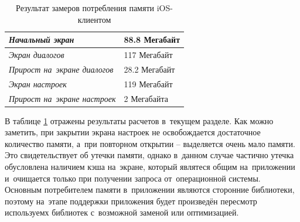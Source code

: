\begin{table}[h!]
\caption{Результат замеров потребления памяти iOS-клиентом}
\label{sec:eng:memory:result}
\centering
\begin{tabularx}{\textwidth}{ |X|X| } 
 \hline
 \emph{Начальный экран} & \num{88.8} Мегабайт \\ 
 \hline
 \emph{Экран диалогов} & \num{117} Мегабайт \\ 
 \hline
 \emph{Прирост на~экране диалогов} & \num{28.2} Мегабайт \\ 
 \hline
 \emph{Экран настроек} & \num{119} Мегабайт \\ 
 \hline
 \emph{Прирост на~экране настроек} & \num{2} Мегабайта \\ 
 \hline
\end{tabularx}
\end{table}

В таблице \ref{sec:eng:memory:result} отражены результаты расчетов в~текущем разделе. Как можно заметить, при закрытии экрана настроек не освобождается достаточное количество памяти, а~при повторном открытии -- выделяется очень мало памяти. Это свидетельствует об утечки памяти, однако в~данном случае частично утечка обусловлена наличием кэша на~экране, который являтеся общим на~приложении и~очищается только при получении запроса от~операционной системы. Основным потребителем памяти в~приложении являются сторонние библиотеки, поэтому на~этапе поддержки приложения будет произведён пересмотр используемх библиотек с~возможной заменой или оптимизацией.